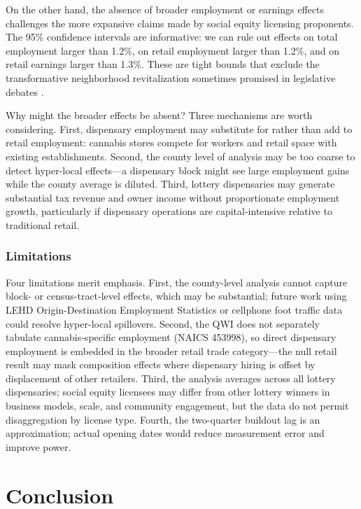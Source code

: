 \documentclass[12pt]{article}
\begin{document}
On the other hand, the absence of broader employment or earnings effects challenges the more expansive claims made by social equity licensing proponents. The 95\% confidence intervals are informative: we can rule out effects on total employment larger than 1.2\%, on retail employment larger than 1.2\%, and on retail earnings larger than 1.3\%. These are tight bounds that exclude the transformative neighborhood revitalization sometimes promised in legislative debates \citep{Hockett2023}.

Why might the broader effects be absent? Three mechanisms are worth considering. First, dispensary employment may substitute for rather than add to retail employment: cannabis stores compete for workers and retail space with existing establishments. Second, the county level of analysis may be too coarse to detect hyper-local effects---a dispensary block might see large employment gains while the county average is diluted. Third, lottery dispensaries may generate substantial tax revenue and owner income without proportionate employment growth, particularly if dispensary operations are capital-intensive relative to traditional retail.

\subsubsection*{Limitations} Four limitations merit emphasis. First, the county-level analysis cannot capture block- or census-tract-level effects, which may be substantial; future work using LEHD Origin-Destination Employment Statistics or cellphone foot traffic data could resolve hyper-local spillovers. Second, the QWI does not separately tabulate cannabis-specific employment (NAICS 453998), so direct dispensary employment is embedded in the broader retail trade category—the null retail result may mask composition effects where dispensary hiring is offset by displacement of other retailers. Third, the analysis averages across all lottery dispensaries; social equity licensees may differ from other lottery winners in business models, scale, and community engagement, but the data do not permit disaggregation by license type. Fourth, the two-quarter buildout lag is an approximation; actual opening dates would reduce measurement error and improve power.


\section{Conclusion}
\end{document}
